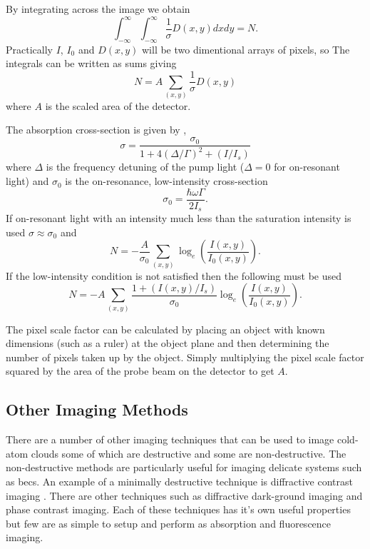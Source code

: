 By integrating across the image we obtain
\begin{equation}
\int_{-\infty}^{\infty} \int_{-\infty}^{\infty} \frac{1}{\sigma}D(x, y) dx dy = N.
\end{equation}
Practically $I$, $I_0$ and $D(x, y)$ will be two dimentional arrays of pixels, so The integrals can be written as sums giving
\begin{equation}
N = A \sum_{(x, y)} \frac{1}{\sigma}D(x, y)
\end{equation}
where $A$ is the scaled area of the detector.

The absorption cross-section is given by \cite{steck_rubidium_2001},
\begin{equation}\label{eq:cross_section}
\sigma = \frac{\sigma_0}{1+4(\Delta/\Gamma)^2 + (I/I_s)}
\end{equation}
where $\Delta$ is the frequency detuning of the pump light ($\Delta=0$ for on-resonant light) and $\sigma_0$ is the on-resonance, low-intensity  cross-section
\begin{equation}
\sigma_0 = \frac{\hbar\omega\Gamma}{2I_s}.
\end{equation}
If on-resonant light with an intensity much less than the saturation intensity is used $\sigma \approx \sigma_0$ and
\begin{equation}
N = -\frac{A}{\sigma_0} \sum_{(x, y)} \log_e\left(\frac{I(x, y)}{I_0(x, y)}\right).
\end{equation}
If the low-intensity condition is not satisfied then the following must be used
\begin{equation}
N = -A \sum_{(x, y)} \frac{1+(I(x, y)/I_s)}{\sigma_0} \log_e\left(\frac{I(x, y)}{I_0(x, y)}\right).
\end{equation}

The pixel scale factor can be calculated by placing an object with known dimensions (such as a ruler) at the object plane and then determining the number of pixels taken up by the object. Simply multiplying the pixel scale factor squared by the area of the probe beam on the detector to get $A$.

\subsection{Other Imaging Methods}

There are a number of other imaging techniques that can be used to image cold-atom clouds some of which are destructive and some are non-destructive. The non-destructive methods are particularly useful for imaging delicate systems such as \glspl{bec}. An example of a minimally destructive technique is diffractive contrast imaging \cite{sheludko_excited-state_2007}. There are other techniques such as diffractive dark-ground imaging\cite{gregory-orfeus_diffractive_2011} and phase contrast imaging\cite{andrews_propagation_1997}. Each of these techniques has it's own useful properties but few are as simple to setup and perform as absorption and fluorescence imaging.


